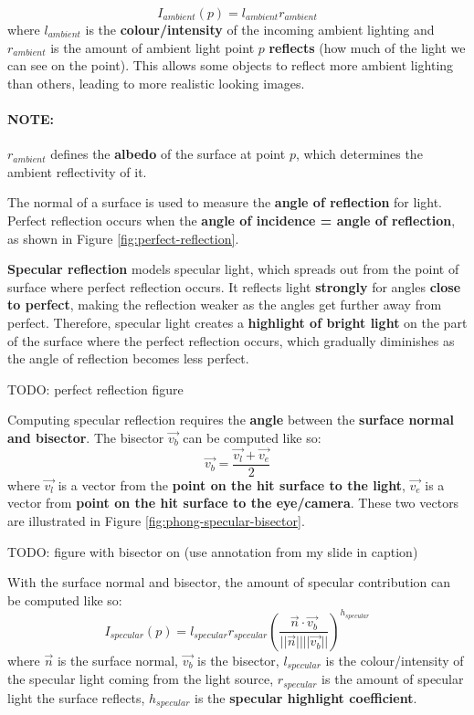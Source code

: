 \documentclass{article}
\begin{document}
\begin{equation}
	I_{ambient}(p) = l_{ambient} r_{ambient}
	\label{eq:phong-ambient}
\end{equation}
where $l_{ambient}$ is the \textbf{colour/intensity} of the incoming ambient lighting and $r_{ambient}$ is the amount of ambient light point $p$ \textbf{reflects} (how much of the light we can see on the point). This allows some objects to reflect more ambient lighting than others, leading to more realistic looking images.

\paragraph{\textbf{NOTE: }} $r_{ambient}$ defines the \textbf{albedo} of the surface at point $p$, which determines the ambient reflectivity of it.

The normal of a surface is used to measure the \textbf{angle of reflection} for light. Perfect reflection occurs when the \textbf{angle of incidence = angle of reflection}, as shown in Figure \ref{fig:perfect-reflection}.

\textbf{Specular reflection} models specular light, which spreads out from the point of surface where perfect reflection occurs. It reflects light \textbf{strongly} for angles \textbf{close to perfect}, making the reflection weaker as the angles get further away from perfect. Therefore, specular light creates a  \textbf{highlight of bright light} on the part of the surface where the perfect reflection occurs, which gradually diminishes as the angle of reflection becomes less perfect.

TODO: perfect reflection figure

Computing specular reflection requires the \textbf{angle} between the \textbf{surface normal and bisector}. The bisector $\vec{v_b}$ can be computed like so:
\begin{equation}
	\vec{v_b} = \frac{\vec{v_l} + \vec{v_e}}{2}
	\label{eq:phong-bisector}
\end{equation}
where $\vec{v_l}$ is a vector from the \textbf{point on the hit surface to the light}, $\vec{v_e}$ is a vector from \textbf{point on the hit surface to the eye/camera}. These two vectors are illustrated in Figure \ref{fig:phong-specular-bisector}.

TODO: figure with bisector on (use annotation from my slide in caption)

With the surface normal and bisector, the amount of specular contribution can be computed like so:
\begin{equation}
	I_{specular}(p) = l_{specular} r_{specular} \left(
	\frac{\vec{n} \cdot \vec{v_b}}{||\vec{n}||||\vec{v_b}||}
	\right)^{h_{specular}}
	\label{eq:phong-specular}
\end{equation}
where $\vec{n}$ is the surface normal, $\vec{v_b}$ is the bisector, $l_{specular}$ is the colour/intensity of the specular light coming from the light source, $r_{specular}$ is the amount of specular light the surface reflects, $h_{specular}$ is the \textbf{specular highlight coefficient}. 
\end{document}
